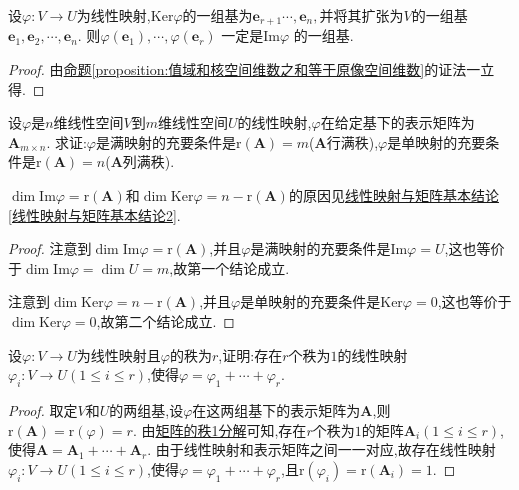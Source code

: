 \documentclass[lang=cn,newtx,10pt,scheme=chinese]{elegantbook}
\begin{document}
\begin{corollary}\label{corollary:由核的基导出值域的基}
    设\(\varphi:V\to U\)为线性映射,$\mathrm{Ker}\varphi $的一组基为$\boldsymbol{e}_{r+1}\cdots ,\boldsymbol{e}_n,$并将其扩张为$V$的一组基$\boldsymbol{e}_1,\boldsymbol{e}_2,\cdots ,\boldsymbol{e}_n.$
   则$\varphi \left( \boldsymbol{e}_1 \right) ,\cdots ,\varphi \left( \boldsymbol{e}_r \right)$ 一定是Im$\varphi$ 的一组基.
\end{corollary}
\begin{proof}
    由\hyperref[proposition:值域和核空间维数之和等于原像空间维数]{命题\ref{proposition:值域和核空间维数之和等于原像空间维数}}的证法一立得.
    
\end{proof}
\begin{proposition}\label{proposition:行/列满秩矩阵对应满/单射}
设\(\varphi\)是\(n\)维线性空间\(V\)到\(m\)维线性空间\(U\)的线性映射,\(\varphi\)在给定基下的表示矩阵为\(\boldsymbol{A}_{m\times n}\). 求证:\(\varphi\)是满映射的充要条件是\(\text{r}(\boldsymbol{A}) = m\)($\boldsymbol{A}$行满秩),\(\varphi\)是单映射的充要条件是\(\text{r}(\boldsymbol{A}) = n\)($\boldsymbol{A}$列满秩).
\end{proposition}
\begin{note}
    \(\dim\text{Im}\varphi=\text{r}(\boldsymbol{A})\)和\(\dim\text{Ker}\varphi=n - \text{r}(\boldsymbol{A})\)的原因见\hyperref[线性映射与矩阵基本结论2]{线性映射与矩阵基本结论\ref{线性映射与矩阵基本结论2}}.
\end{note}
\begin{proof}
注意到\(\dim\text{Im}\varphi=\text{r}(\boldsymbol{A})\),并且\(\varphi\)是满映射的充要条件是\(\text{Im}\varphi = U\),这也等价于\(\dim\text{Im}\varphi=\dim U = m\),故第一个结论成立.

注意到\(\dim\text{Ker}\varphi=n - \text{r}(\boldsymbol{A})\),并且\(\varphi\)是单映射的充要条件是\(\text{Ker}\varphi = 0\),这也等价于\(\dim\text{Ker}\varphi = 0\),故第二个结论成立.
\end{proof}

\begin{proposition}\label{proposition:线性映射的秩1分解}
设\(\varphi:V\to U\)为线性映射且\(\varphi\)的秩为\(r\),证明:存在\(r\)个秩为\(1\)的线性映射\(\varphi_i:V\to U(1\leq i\leq r)\),使得\(\varphi=\varphi_1+\cdots+\varphi_r\).
\end{proposition}
\begin{proof}
    取定\(V\)和\(U\)的两组基,设\(\varphi\)在这两组基下的表示矩阵为\(\boldsymbol{A}\),则\(\text{r}(\boldsymbol{A})=\text{r}(\varphi)=r\). 由\hyperref[proposition:矩阵的秩1分解]{矩阵的秩1分解}可知,存在\(r\)个秩为\(1\)的矩阵\(\boldsymbol{A}_i(1\leq i\leq r)\),使得\(\boldsymbol{A}=\boldsymbol{A}_1+\cdots+\boldsymbol{A}_r\). 由于线性映射和表示矩阵之间一一对应,故存在线性映射\(\varphi_i:V\to U(1\leq i\leq r)\),使得\(\varphi=\varphi_1+\cdots+\varphi_r\),且\(\text{r}(\varphi_i)=\text{r}(\boldsymbol{A}_i)=1\).
\end{proof}
\end{document}
